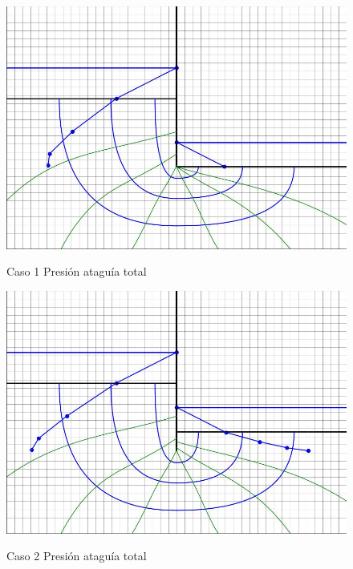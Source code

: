 \begin{figure}[H]
    \centering
    \begin{minipage}{0.32\textwidth}
        \centering
        \includegraphics[width=\textwidth]{GRAFICOS/caso_1_presion_ataguia_total.jpg}
        \caption{Caso 1 Presión ataguía total}
        \label{fig:caso_1_presion_ataguia_total}
    \end{minipage}
    \begin{minipage}{0.32\textwidth}
        \centering
        \includegraphics[width=\textwidth]{GRAFICOS/caso_2_presion_ataguia_total.jpg}
        \caption{Caso 2 Presión ataguía total}
        \label{fig:caso_2_presion_ataguia_total}
    \end{minipage}

\end{figure}
